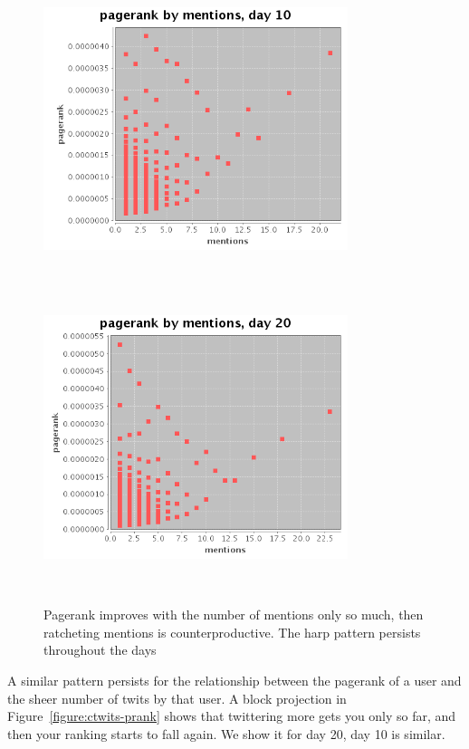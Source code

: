 \documentclass[10pt,oneside]{memoir}
\begin{document}
\begin{figure}
\begin{center}
\includegraphics[height=3.5in,width=3.5in]{figures/points-nments-prank-10}
\includegraphics[height=3.5in,width=3.5in]{figures/points-nments-prank-20}
\caption{Pagerank improves with the number of mentions only so much, then ratcheting mentions is counterproductive.  The harp pattern persists \label{figure:harp}
throughout the days}    
\end{center}
\end{figure}
A similar pattern persists for the relationship between the pagerank of a user and the sheer number of twits by that user.  A block projection in Figure~\ref{figure:ctwits-prank} shows that twittering more gets you only so far, and then your ranking starts to fall again.  We show it for day 20, day 10 is similar.
\end{document}
